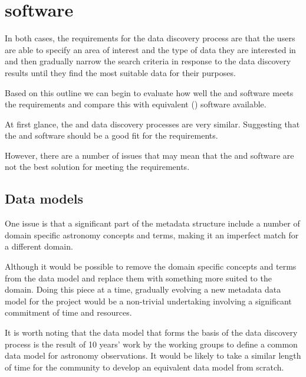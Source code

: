 \documentclass{article}
\begin{document}
\section{\cite{ivoa} software}

In both cases, the requirements for the data discovery process are that the
users are able to specify an area of interest and the type of data they are
interested in and then gradually narrow the search criteria in response to
the data discovery results until they find the most suitable data
for their purposes.

Based on this outline we can begin to evaluate how well the \cite{ivoa}
and \cite{astro} software meets the \cite{trop} requirements and compare
this with equivalent  (\cite{gis}) software available.

At first glance, the \cite{ivoa} and \cite{trop} data discovery processes
are very similar. Suggesting that the \cite{ivoa} and \cite{astro} software
should be a good fit for the \cite{trop} requirements.

However, there are a number of issues that may mean that the \cite{ivoa} and
\cite{astro} software are not the best solution for meeting the \cite{trop}
requirements.

\subsection{Data models}

One issue is that a significant part of the \cite{ivoa} metadata structure
include a number of domain specific astronomy concepts and terms, making
it an imperfect match for a different domain.

Although it would be possible to remove the domain specific concepts and
terms from the \cite{ivoa} data model and replace them with something more suited to the \cite{trop} domain.
Doing this piece at a time, gradually evolving a new metadata data model
for the \cite{trop} project would be a non-trivial undertaking involving
a significant commitment of time and resources.

It is worth noting that the \cite{ivoa} \cite{ivoa-obscore} data model that
forms the basis of the \cite{ivoa} data discovery process is the result
of 10 years' work by the \cite{ivoa} working groups to define a common data
model for astronomy observations.
It would be likely to take a similar length of time for the \cite{trop}
community to develop an equivalent data model from scratch.
\end{document}
